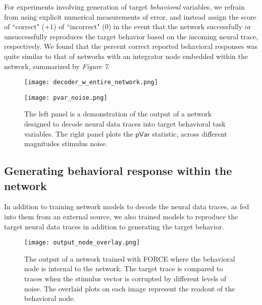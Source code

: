 \documentclass[12pt,a4paper,final]{iopart}
\begin{document}
For experiments involving generation of target \emph{behavioral} variables, we refrain from using explicit numerical measurements of error, and instead assign the score of ``correct" ($+1$) of ``incorrect" ($0$) in the event that the network successfully or unsuccessfully reproduces the target behavior based on the incoming neural trace, respectively. We found that the percent correct reported behavioral responses was quite similar to that of networks with an integrator node embedded within the network, summarized by \emph{Figure 7}.
\begin{figure}
    \centering
    \begin{minipage}{0.495\linewidth}
        \centering
        \texttt{[image: decoder\_w\_entire\_network.png]}
    \end{minipage}
    \begin{minipage}{0.495\linewidth}
        \centering
        \texttt{[image: pvar\_noise.png]}
    \end{minipage}
    \caption{The left panel is a demonstration of the output of a network designed to decode neural data traces into target behavioral task variables. The right panel plots the $\mathsf{pVar}$ statistic, across different magnitudes stimulus noise.}
    \label{fig:my_label}
\end{figure}

\subsection{Generating behavioral response within the network}
In addition to training network models to decode the neural data traces, as fed into them from an external source, we also trained models to reproduce the target neural data traces in addition to generating the target behavior. 
\begin{figure}
    \centering
    \texttt{[image: output\_node\_overlay.png]}
    \caption{The output of a network trained with FORCE where the behavioral node is internal to the network. The target trace is compared to traces when the stimulus vector is corrupted by different levels of noise. The overlaid plots on each image represent the readout of the behavioral node.}
    \label{fig:my_label}
\end{figure}
\end{document}
